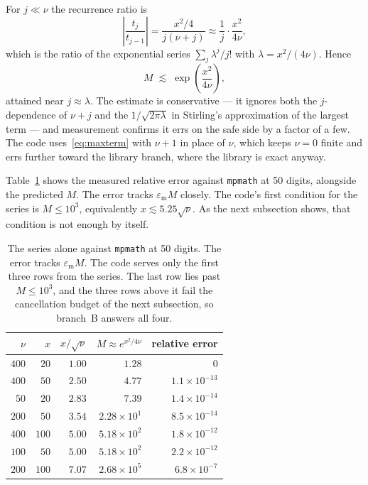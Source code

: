 \documentclass[11pt]{article}
\theoremstyle{remark}
\newcommand{\code}[1]{\texttt{#1}}
\newcommand{\eps}{\varepsilon_{\mathrm{m}}}
\begin{document}
For $j\ll\nu$ the recurrence ratio is
\[
  \left|\frac{t_j}{t_{j-1}}\right| = \frac{x^2/4}{j(\nu+j)} \approx \frac{1}{j}\cdot\frac{x^2}{4\nu},
\]
which is the ratio of the exponential series $\sum_j \lambda^j/j!$ with $\lambda=x^2/(4\nu)$.
Hence
\begin{equation}
  M \;\lesssim\; \exp\!\left(\frac{x^2}{4\nu}\right),
  \label{eq:maxterm}
\end{equation}
attained near $j\approx\lambda$. The estimate is conservative --- it ignores both the
$j$-dependence of $\nu+j$ and the $1/\sqrt{2\pi\lambda}$ in Stirling's approximation of the
largest term --- and measurement confirms it errs on the safe side by a factor of a few.
The code uses~\eqref{eq:maxterm} with $\nu+1$ in place of $\nu$, which keeps $\nu=0$ finite
and errs further toward the library branch, where the library is exact anyway.

Table~\ref{tab:seriesacc} shows the measured relative error against \code{mpmath} at
50 digits, alongside the predicted $M$. The error tracks $\eps M$ closely. The code's first
condition for the series is $M\le10^3$, equivalently $x\lesssim 5.25\sqrt{\nu}$. As the next
subsection shows, that condition is not enough by itself.

\begin{table}[h]
\centering
\begin{tabular}{rrrrr}
\toprule
$\nu$ & $x$ & $x/\sqrt{\nu}$ & $M\approx e^{x^2/4\nu}$ & relative error\\
\midrule
$400$ & $20$  & $1.00$ & $1.28$              & $0$ \\
$400$ & $50$  & $2.50$ & $4.77$              & $1.1\times10^{-13}$\\
$50$  & $20$  & $2.83$ & $7.39$              & $1.4\times10^{-14}$\\
$200$ & $50$  & $3.54$ & $2.28\times10^{1}$  & $8.5\times10^{-14}$\\
$400$ & $100$ & $5.00$ & $5.18\times10^{2}$  & $1.8\times10^{-12}$\\
$100$ & $50$  & $5.00$ & $5.18\times10^{2}$  & $2.2\times10^{-12}$\\
$200$ & $100$ & $7.07$ & $2.68\times10^{5}$  & $6.8\times10^{-7}$\\
\bottomrule
\end{tabular}
\caption{The series alone against \code{mpmath} at 50 digits. The error tracks $\eps M$.
The code serves only the first three rows from the series. The last row lies past $M\le10^3$,
and the three rows above it fail the cancellation budget of the next subsection, so branch~B
answers all four.}
\label{tab:seriesacc}
\end{table}
\end{document}
